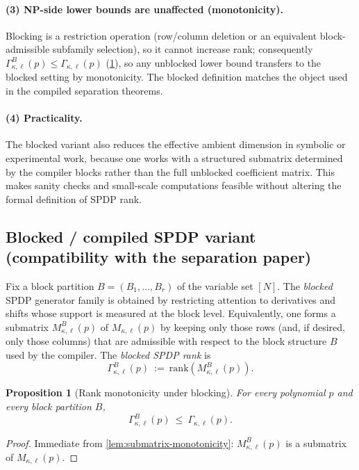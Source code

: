 \documentclass[12pt]{article}
\newtheorem{proposition}[theorem]{Proposition}
\theoremstyle{definition}
\theoremstyle{remark}
\begin{document}
\paragraph{(3) NP-side lower bounds are unaffected (monotonicity).}
Blocking is a restriction operation (row/column deletion or an equivalent block-admissible
subfamily selection), so it cannot increase rank;
consequently $\Gamma^B_{\kappa,\ell}(p)\le \Gamma_{\kappa,\ell}(p)$ (\ref{prop:blocked-rank-monotone}), so any unblocked lower bound transfers to the blocked setting by monotonicity.
The blocked definition matches the object used in the compiled separation theorems.

\paragraph{(4) Practicality.}
The blocked variant also reduces the effective ambient dimension in symbolic or experimental
work, because one works with a structured submatrix determined by the compiler blocks rather
than the full unblocked coefficient matrix.
This makes sanity checks and small-scale computations feasible without altering the formal
definition of SPDP rank.

\subsection{Blocked / compiled SPDP variant (compatibility with the separation paper)}
\label{subsec:blocked-spdp-compat}

Fix a block partition $B=(B_1,\dots,B_r)$ of the variable set $[N]$.
The \emph{blocked} SPDP generator family is obtained by restricting attention to
derivatives and shifts whose support is measured at the block level.
Equivalently, one forms a submatrix $M^B_{\kappa,\ell}(p)$ of $M_{\kappa,\ell}(p)$
by keeping only those rows (and, if desired, only those columns) that are admissible
with respect to the block structure $B$ used by the compiler.
The \emph{blocked SPDP rank} is
\[
\Gamma^B_{\kappa,\ell}(p)\ :=\ \mathrm{rank}\!\left(M^B_{\kappa,\ell}(p)\right).
\]

\begin{proposition}[Rank monotonicity under blocking]
\label{prop:blocked-rank-monotone}
For every polynomial $p$ and every block partition $B$,
\[
\Gamma^B_{\kappa,\ell}(p)\ \le\ \Gamma_{\kappa,\ell}(p).
\]
\end{proposition}

\begin{proof}
Immediate from \ref{lem:submatrix-monotonicity}: $M^B_{\kappa,\ell}(p)$ is a submatrix of $M_{\kappa,\ell}(p)$.
\end{proof}
\end{document}
